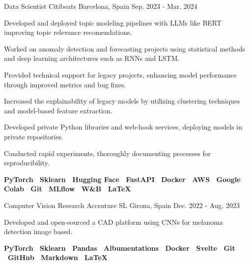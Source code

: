 \begin{cventries}
  \cventry
  {Data Scientist} %
  {Citibeats} %
  {Barcelona, Spain} %
  {Sep. 2023 - Mar. 2024} %
  {
  \begin{cvitems}
    \item {Developed and deployed topic modeling pipelines with LLMs like BERT improving topic relevance recomendations.}
    \item {Worked on anomaly detection and forecasting projects using statistical methods and deep learning architectures
      such as RNNs and LSTM.}
    \item {Provided technical support for legacy projects, enhancing model performance through improved metrics and bug fixes.}
    \item {Increased the explainability of legacy models by utilizing clustering techniques and model-based feature extraction.}
    \item {Developed private Python libraries and web-hook services, deploying models in private repositories.}
    \item {Conducted rapid experiments, thoroughly documenting processes for reproducibility.}
    \item {
      \textbf{
        PyTorch \textbar \
        Sklearn \textbar \
        Hugging Face \textbar \
        FastAPI \textbar \
        Docker \textbar \
        AWS \textbar \
        Google Colab \textbar \
        Git \textbar \
        MLflow \textbar \
        W\&B \textbar \
        \LaTeX
     }
    }
  \end{cvitems}
  }


    \cventry
    {Computer Vision Research} %
    {Accenture SL} %
    {Girona, Spain} %
    {Dec. 2022 - Aug. 2023} %
    {
    \begin{cvitems}
    \item {Developed and open-sourced a CAD platform using CNNs for melanoma detection image based.}
    \item {
      \textbf{
        PyTorch \textbar \
        Sklearn \textbar \
        Pandas \textbar \
        Albumentations \textbar \
        Docker \textbar \
        Svelte \textbar \
        Git \textbar \
        GitHub \textbar \
        Markdown \textbar \
        \LaTeX
     }
    }
    \end{cvitems}
    }


\end{cventries}
